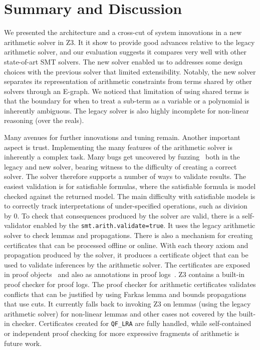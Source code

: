 \section{Summary and Discussion}

We presented the architecture and a cross-cut of system innovations in a new arithmetic solver in Z3.
It it show to provide good advances relative to the legacy arithmetic solver,
and our evaluation suggests it compares very well with other state-of-art SMT solvers.
The new solver enabled us to addresses some design choices with the previous solver that limited extensibility.
Notably, the new solver separates its representation of arithmetic constraints from terms shared by other solvers through an E-graph.
We noticed that limitation of using shared terms is that the boundary for when to treat a sub-term as a variable or a polynomial is inherently
ambiguous. The legacy solver is also highly incomplete for non-linear
reasoning (over the reals). 

Many avenues for further innovations and tuning remain. Another important aspect is trust.
Implementing the many features of the arithmetic solver is inherently a complex task.
Many bugs get uncovered by fuzzing~\cite{DBLP:conf/sat/BrummayerLB10,DBLP:conf/sigsoft/MansurCWZ20,winterer-zhang-su-oopsla2020,winterer-zhang-su-pldi2020,DBLP:journals/pacmpl/ParkWZS21,DHuang,Maolin23} both in the legacy and new solver, 
bearing witness to the difficulty of creating a correct solver. The solver therefore supports a number of ways to validate results.
The easiest validation is for satisfiable formulas, where the satisfiable formula is model checked against the returned model.
The main difficulty with satisfiable models is to correctly track interpretations of under-specified operations, such as division by 0.
To check that consequences produced by the solver are valid, there is a self-validator 
enabled by the {\tt smt.arith.validate=true}. It uses the legacy arithmetic solver
to check lemmas and propagations. 
There is also a mechanism for creating certificates that can be processed offline or online.
With each theory axiom and propagation produced by the solver, it produces a certificate object that can be used to validate
inferences by the arithmetic solver. The certificates are exposed in proof objects~\cite{MouraB08b} and also as annotations in proof logs~\cite{z3prooflogs}.
Z3 contains a built-in proof checker for proof logs. The proof checker for arithmetic certificates validates
conflicts that can be justified by using Farkas lemma and bounds propagations that use cuts. It currently falls back to invoking
Z3 on lemmas (using the legacy arithmetic solver) for non-linear lemmas and other cases not covered by the built-in checker.
Certificates created for {\tt QF\_LRA} are fully handled, while self-contained or independent proof checking for more expressive fragments
of arithmetic is future work.
